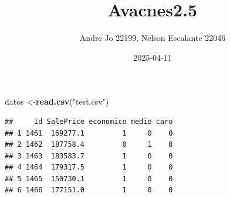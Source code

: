 \documentclass[
]{article}
\title{Avacnes2.5}
\author{Andre Jo 22199, Nelson Escalante 22046}
\date{2025-04-11}
\newenvironment{Shaded}{\begin{snugshade}}{\end{snugshade}}
\newcommand{\FunctionTok}[1]{\textcolor[rgb]{0.13,0.29,0.53}{\textbf{#1}}}
\newcommand{\NormalTok}[1]{#1}
\newcommand{\OtherTok}[1]{\textcolor[rgb]{0.56,0.35,0.01}{#1}}
\newcommand{\StringTok}[1]{\textcolor[rgb]{0.31,0.60,0.02}{#1}}
\begin{document}
\maketitle

\begin{Shaded}
\begin{Highlighting}[]
\NormalTok{datos }\OtherTok{\textless{}{-}}\FunctionTok{read.csv}\NormalTok{(}\StringTok{"test.csv"}\NormalTok{)}
\end{Highlighting}
\end{Shaded}

\begin{verbatim}
##     Id SalePrice economico medio caro
## 1 1461  169277.1         1     0    0
## 2 1462  187758.4         0     1    0
## 3 1463  183583.7         1     0    0
## 4 1464  179317.5         1     0    0
## 5 1465  150730.1         1     0    0
## 6 1466  177151.0         1     0    0
\end{verbatim}
\end{document}
